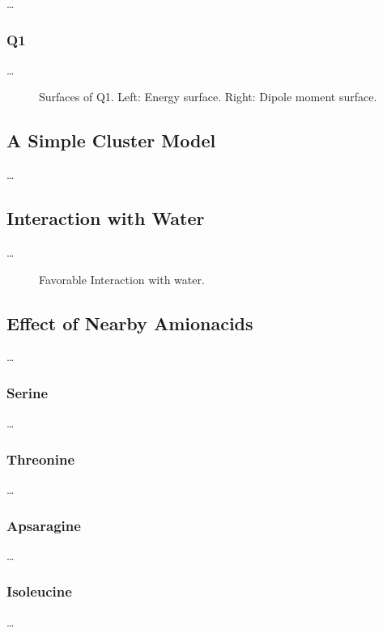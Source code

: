 \ldots
\subsubsection{Q1}

\ldots
\begin{figure}[hb!]
  \centering
  \begin{minipage}[]{0.49\textwidth}
    \centering
    \small
    
  \end{minipage}%
  \begin{minipage}[]{0.47\textwidth}
    \centering
    \small
    
  \end{minipage}
  \label{fig:Q1_surf}
  \caption[Surfaces of Q1]{Surfaces of Q1. Left: Energy surface. Right: Dipole moment surface.}
\end{figure}
\subsection{A Simple Cluster Model}
\ldots

\subsection{Interaction with Water}
\ldots
\begin{figure}[th!]
    \centering
    
    \caption[Short caption for Table of Figures]{Favorable Interaction with water.}
    \label{fig:H2O_fav}
\end{figure}

\subsection{Effect of Nearby Amionacids}
\ldots

\subsubsection{Serine}
\ldots
\subsubsection{Threonine}
\ldots
\subsubsection{Apsaragine}
\ldots
\subsubsection{Isoleucine}
\ldots

\cleardoublepage

